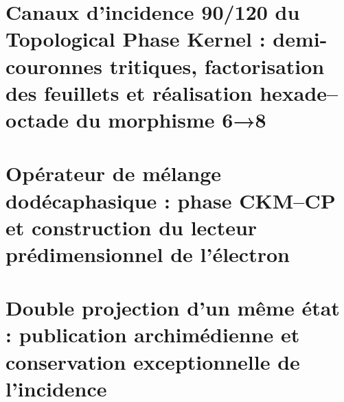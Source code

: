 \chapter{Canaux d'incidence 90/120 du Topological Phase Kernel : demi-couronnes tritiques, factorisation des feuillets et réalisation hexade–octade du morphisme 6→8}
\label{chap:sucesor-102-15}
\begin{HMTScientificOwnerSubordinated}

\end{HMTScientificOwnerSubordinated}



















\chapter{Opérateur de mélange dodécaphasique : phase CKM–CP et construction du lecteur prédimensionnel de l'électron}
\label{chap:sucesor-102-16}
















\chapter{Double projection d'un même état : publication archimédienne et conservation exceptionnelle de l'incidence}
\label{chap:sucesor-102-17}
\label{chap:doble}



